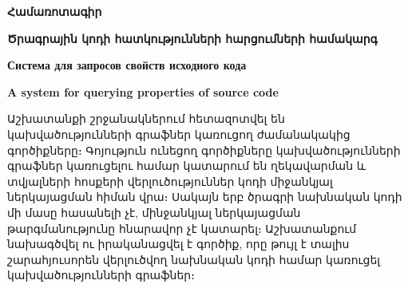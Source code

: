 {
	\thispagestyle{plain}
	\begin{center}
		\large
		\textbf{Համառոտագիր}
	\end{center}

	\begin{flushleft}
		\vspace{0.5cm}

		\large
		\textbf{Ծրագրային կոդի հատկությունների հարցումների համակարգ}

		\vspace{0.2cm}
		\textbf{Система для запросов свойств исходного кода}

		\vspace{0.2cm}
		\textbf{A system for querying properties of source code}

		\vspace{0.5cm}

	\end{flushleft}
	Աշխատանքի շրջանակներում հետազոտվել են կախվածությունների գրաֆներ կառուցող ժամանակակից գործիքները։ Գոյություն ունեցող գործիքները կախվածությունների գրաֆներ կառուցելու համար կատարում են ղեկավարման և տվյալների հոսքերի վերլուծություններ կոդի միջանկյալ ներկայացման հիման վրա։ Սակայն երբ ծրագրի նախնական կոդի մի մասը հասանելի չէ, մինջանկյալ ներկայացման թարգմանությունը հնարավոր չէ կատարել։ Աշխատանքում նախագծվել ու իրականացվել է գործիք, որը թույլ է տալիս շարահյուսորեն վերլուծվող նախնական կոդի համար կառուցել կախվածությունների գրաֆներ։
}